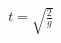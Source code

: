 \documentclass[preview]{standalone}
\begin{document}
\begin{align*}
t = \sqrt{\frac{2}{g}} \,
\end{align*}
\end{document}

